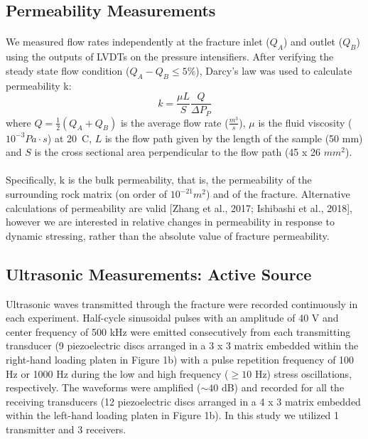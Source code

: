 \documentclass[letterpaper,10pt]{article}
\begin{document}
\subsection{Permeability Measurements}
\paragraph{} We measured flow rates independently at the fracture inlet ($Q_A$) and outlet ($Q_B$) using the outputs of LVDTs on the pressure intensifiers. After verifying the steady state flow condition ($Q_{A} - Q_{B}  \leq 5 \% $), Darcy’s law was used to calculate permeability k:
\begin{equation} \label{eq:perm}
	k = \frac{\mu L}{S} \frac{Q}{\Delta P_P}
\end{equation}
where $Q = \frac{1}{2} (Q_A + Q_B )$ is the average flow rate ($\frac{m^3}{s}$), $\mu$ is the fluid viscosity ($10^{-3} Pa\cdot s$) at 20\textdegree\ C, $L$ is the flow path given by the length of the sample (50 mm) and $S$ is the cross sectional area perpendicular to the flow path (45 x 26 $mm^2$).
\paragraph{} Specifically, k is the bulk permeability, that is, the permeability of the surrounding rock matrix (on order of $10^{-21} m^2$) and of the fracture. Alternative calculations of permeability are valid [Zhang et al., 2017; Ishibashi et al., 2018], however we are interested in relative changes in permeability in response to dynamic stressing, rather than the absolute value of fracture permeability.


\subsection{Ultrasonic Measurements: Active Source}
Ultrasonic waves transmitted through the fracture were recorded continuously in each experiment. Half-cycle sinusoidal pulses with an amplitude of 40 V and center frequency of 500 kHz were emitted consecutively from each transmitting transducer (9 piezoelectric discs arranged in a 3 x 3 matrix embedded within the right-hand loading platen in Figure 1b) with a pulse repetition frequency of 100 Hz or 1000 Hz during the low and high frequency ($\geq 10$ Hz) stress oscillations, respectively. The waveforms were amplified ($\sim 40$ dB) and recorded for all the receiving transducers (12 piezoelectric discs arranged in a 4 x 3 matrix embedded within the left-hand loading platen in Figure 1b). In this study we utilized 1 transmitter and 3 receivers. 
\end{document}
